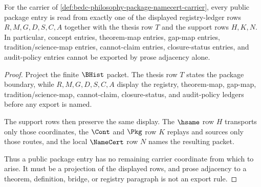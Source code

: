 \begin{theorem}
\label{thm:bedc-philosophy-package-registry-ledger-exactness}
For the carrier of \autoref{def:bedc-philosophy-package-namecert-carrier}, every public package entry is read from exactly one of the displayed registry-ledger rows $R,M,G,D,S,C,A$ together with the thesis row $T$ and the support rows $H,K,N$. In particular, concept entries, theorem-map entries, gap-map entries, tradition/science-map entries, cannot-claim entries, closure-status entries, and audit-policy entries cannot be exported by prose adjacency alone.
\end{theorem}
\begin{proof}
Project the finite $\BHist$ packet. The thesis row $T$ states the package boundary, while $R,M,G,D,S,C,A$ display the registry, theorem-map, gap-map, tradition/science-map, cannot-claim, closure-status, and audit-policy ledgers before any export is named.

The support rows then preserve the same display. The $\hsame$ row $H$ transports only those coordinates, the $\Cont$ and $\Pkg$ row $K$ replays and sources only those routes, and the local $\NameCert$ row $N$ names the resulting packet.

Thus a public package entry has no remaining carrier coordinate from which to arise. It must be a projection of the displayed rows, and prose adjacency to a theorem, definition, bridge, or registry paragraph is not an export rule.
\end{proof}

